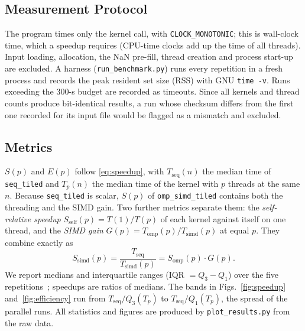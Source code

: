 \documentclass[conference,a4paper]{IEEEtran}
\newcommand{\code}[1]{\texttt{#1}}
\newcommand{\seqk}{\code{seq\_tiled}}
\newcommand{\simdk}{\code{omp\_simd\_tiled}}
\newcommand{\Tseq}{T_{\mathrm{seq}}}
\newcommand{\Sself}{S_{\mathrm{self}}}
\begin{document}
\subsection{Measurement Protocol}
The program times only the kernel call, with \code{CLOCK\_MONOTONIC}; this is
wall-clock time, which a speedup requires (CPU-time clocks add up the time of
all threads). Input loading, allocation, the NaN pre-fill, thread creation and
process start-up are excluded. A harness (\code{run\_benchmark.py}) runs every
repetition in a fresh process and records the peak resident set size (RSS)
with GNU \code{time -v}. Runs exceeding the 300-s budget are recorded as
timeouts. Since all kernels and thread counts produce bit-identical results, a
run whose checksum differs from the first one recorded for its input file
would be flagged as a mismatch and excluded.

\subsection{Metrics}
$S(p)$ and $E(p)$ follow \eqref{eq:speedup}, with $\Tseq(n)$ the median time
of \seqk{} and $T_p(n)$ the median time of the kernel with $p$ threads at the
same $n$. Because \seqk{} is scalar, $S(p)$ of \simdk{} contains both the
threading and the SIMD gain. Two further metrics separate them: the
\emph{self-relative speedup} $\Sself(p) = T(1)/T(p)$ of each kernel against
itself on one thread, and the \emph{SIMD gain}
$G(p) = T_{\mathrm{omp}}(p)/T_{\mathrm{simd}}(p)$ at equal $p$. They combine
exactly as
\begin{equation}
  S_{\mathrm{simd}}(p) = \frac{\Tseq}{T_{\mathrm{simd}}(p)}
                       = S_{\mathrm{omp}}(p)\cdot G(p).
  \label{eq:decomposition}
\end{equation}
We report medians and interquartile ranges (IQR $= Q_3 - Q_1$) over the five
repetitions~\cite{georges2007,kalibera2013}; speedups are ratios of medians.
The bands in Figs.~\ref{fig:speedup} and~\ref{fig:efficiency} run from
$\Tseq/Q_3(T_p)$ to $\Tseq/Q_1(T_p)$, the spread of the parallel runs. All
statistics and figures are produced by \code{plot\_results.py} from the raw
data.
\end{document}
